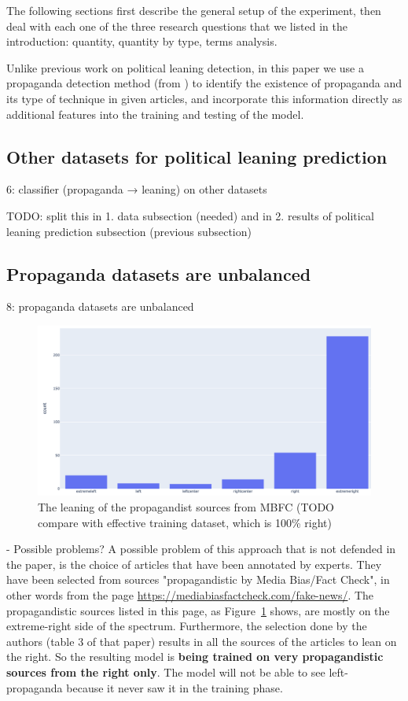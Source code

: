 The following sections first describe the general setup of the experiment, then deal with each one of the three research questions that we listed in the introduction: quantity, quantity by type, terms analysis.%


Unlike previous work on political leaning detection, in this paper we use a propaganda detection method (from \citet{da2019fine}) to identify the existence of propaganda and its type of technique in given articles, and incorporate this information directly as additional features into the training and testing of the model.  


\subsection{Other datasets for political leaning prediction}
6: classifier (propaganda → leaning) on other datasets

TODO: split this in 
1. data subsection (needed) and in
2. results of political leaning prediction subsection (previous subsection)

\subsection{Propaganda datasets are unbalanced}

8: propaganda datasets are unbalanced

\begin{figure}[!htb]
   \centering
   \includegraphics[width=\linewidth]{figures/leaning_questionable.png}
   \caption{The leaning of the propagandist sources from MBFC (TODO compare with effective training dataset, which is 100\% right)}
   \label{fig:mbfc_leaning}
\end{figure}

- Possible problems?
A possible problem of this approach that is not defended in the paper, is the choice of articles that have been annotated by experts. They have been selected from sources "propagandistic by Media Bias/Fact Check", in other words from the page \url{https://mediabiasfactcheck.com/fake-news/}. The propagandistic sources listed in this page, as Figure~\ref{fig:mbfc_leaning} shows, are mostly on the extreme-right side of the spectrum. Furthermore, the selection done by the authors (table 3 of that paper) results in all the sources of the articles to lean on the right.
So the resulting model is \textbf{being trained on very propagandistic sources from the right only}. The model will not be able to see left-propaganda because it never saw it in the training phase.



